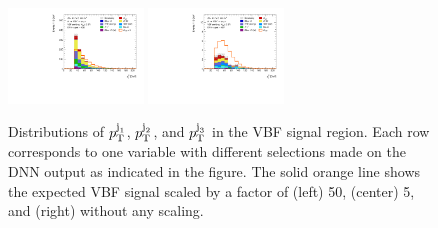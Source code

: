 \begin{figure}[h]
{            \includegraphics[width=0.32\textwidth]{figures/hww/dnn/blinded/run2-emme-CutVBFSR_DNN25-subleadJetPt-lin.pdf} \hfill
            \includegraphics[width=0.32\textwidth]{figures/hww/dnn/blinded/run2-emme-CutVBFSR_DNN87-subleadJetPt-lin.pdf}
        } \\
        {\caption[Distributions of $\pTjone$, $\pTjtwo$, and $\pTjthree$ in the VBF \TwoJet signal region.]{Distributions of $\pTjone$, $\pTjtwo$, and $\pTjthree$ in the VBF \TwoJet signal region.
                Each row corresponds to one variable with different selections made on the DNN output as indicated in the figure. The solid orange line shows the expected VBF signal scaled by a factor of (left) 50, (center) 5, and (right) without any scaling.
                \label{app:fig:dnn-inputs-vbf-top3}}}
    \end{figure}



